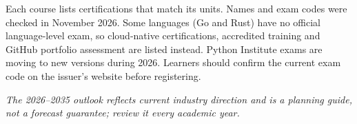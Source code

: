 {\small Each course lists certifications that match its units. Names and exam codes were checked in November 2026.
Some languages (Go and Rust) have no official language-level exam, so cloud-native certifications, accredited training and GitHub
portfolio assessment are listed instead. Python Institute exams are moving to new versions during 2026. Learners should confirm the
current exam code on the issuer's website before registering.}

{\footnotesize\itshape The 2026--2035 outlook reflects current industry direction and is a planning guide, not a forecast guarantee; review it every academic year.}



\clearpage
